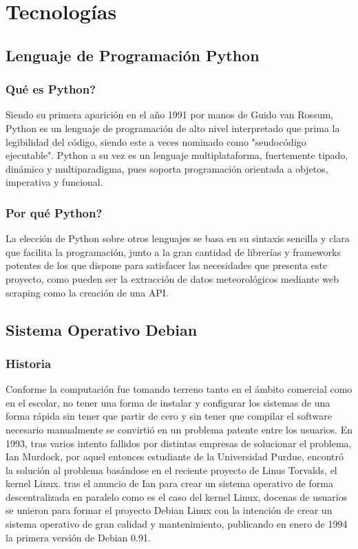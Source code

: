 \chapter[Tecnologías]{Tecnologías}
\label{Chap2}

\section{Lenguaje de Programación Python}

\subsection{Qué es Python?}
Siendo su primera aparición en el año 1991 por manos de Guido van Rossum, Python es un lenguaje de programación de alto nivel interpretado que prima la legibilidad del código, siendo este a veces nominado como "seudocódigo ejecutable".
\newline
\newline
Python a su vez es un lenguaje multiplataforma, fuertemente tipado, dinámico y multiparadigma, pues soporta programación orientada a objetos, imperativa y funcional.

\subsection{Por qué Python?}
La elección de Python sobre otros lenguajes se basa en su sintaxis sencilla y clara que facilita la programación, junto a la gran cantidad de librerías y frameworks potentes de los que dispone para satisfacer las necesidades que presenta este proyecto, como pueden ser la extracción de datos meteorológicos mediante web scraping como la creación de una API.

\newpage

\section{Sistema Operativo Debian}

\subsection{Historia}
Conforme la computación fue tomando terreno tanto en el ámbito comercial como en el escolar, no tener una forma de instalar y configurar los sistemas de una forma rápida sin tener que partir de cero y sin tener que compilar el software necesario manualmente se convirtió en un problema patente entre los usuarios.
\newline
\newline
En 1993, tras varios intento fallidos por distintas empresas de solucionar el problema, Ian Murdock, por aquel entonces estudiante de la Universidad Purdue, encontró la solución al problema basándose en el reciente proyecto de Linus Torvalds, el kernel Linux. tras el anuncio de Ian para crear un sistema operativo de forma descentralizada en paralelo como es el caso del kernel Linux, docenas de usuarios se unieron para formar el proyecto Debian Linux con la intención de crear un sistema operativo de gran calidad y mantenimiento, publicando en enero de 1994 la primera versión de Debian 0.91.

